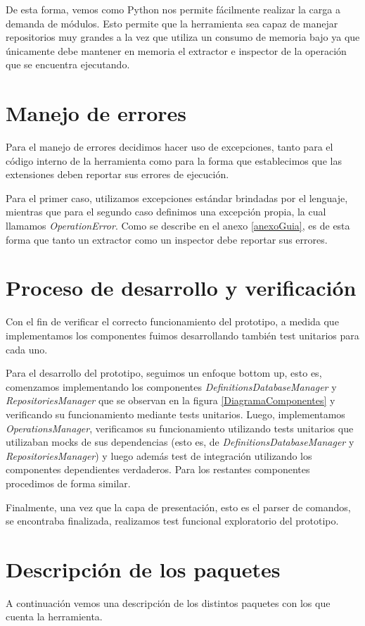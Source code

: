 De esta forma, vemos como Python nos permite fácilmente realizar la carga a demanda de módulos. Esto permite que la herramienta sea capaz de manejar repositorios muy grandes a la vez que utiliza un consumo de memoria bajo ya que únicamente debe mantener en memoria el extractor e inspector de la operación que se encuentra ejecutando.

\section{Manejo de errores}
Para el manejo de errores decidimos hacer uso de excepciones, tanto para el código interno de la herramienta como para la forma que establecimos que las extensiones deben reportar sus errores de ejecución.

Para el primer caso, utilizamos excepciones estándar brindadas por el lenguaje, mientras que para el segundo caso definimos una excepción propia, la cual llamamos \emph{OperationError}. Como se describe en el anexo \ref{anexoGuia}, es de esta forma que tanto un extractor como un inspector debe reportar sus errores.

\section{Proceso de desarrollo y verificación} \label{procesoDesarrollo}
Con el fin de verificar el correcto funcionamiento del prototipo, a medida que implementamos los componentes fuimos desarrollando también test unitarios para cada uno.

Para el desarrollo del prototipo, seguimos un enfoque bottom up, esto es, comenzamos implementando los componentes \emph{DefinitionsDatabaseManager} y \emph{RepositoriesManager} que se observan en la figura \ref{DiagramaComponentes} y verificando su funcionamiento mediante tests unitarios. Luego, implementamos \emph{OperationsManager}, verificamos su funcionamiento utilizando tests unitarios que utilizaban mocks de sus dependencias (esto es, de \emph{DefinitionsDatabaseManager} y \emph{RepositoriesManager}) y luego además test de integración utilizando los componentes dependientes verdaderos. Para los restantes componentes procedimos de forma similar.

Finalmente, una vez que la capa de presentación, esto es el parser de comandos, se encontraba finalizada, realizamos test funcional exploratorio del prototipo.

\section{Descripción de los paquetes}
A continuación vemos una descripción de los distintos paquetes con los que cuenta la herramienta.

